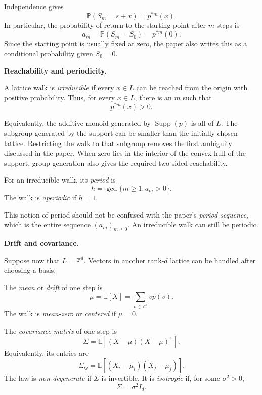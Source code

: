 Independence gives
$$
\mathbb P(S_m=s+x)=p^{*m}(x).
$$
In particular, the probability of return
to the starting point after $m$ steps is
$$
a_m=\mathbb P(S_m=S_0)=p^{*m}(0).
$$
Since the starting point is usually fixed
at zero, the paper also writes this as a
conditional probability given $S_0=0$.

\medskip\noindent
{\bf Reachability and periodicity.}

\begin{definition}
\label{definition-irreducible-lattice-walk}
A lattice walk is \emph{irreducible} if
every $x\in L$ can be reached from the
origin with positive probability. Thus,
for every $x\in L$, there is an $m$ such
that
$$
p^{*m}(x)>0.
$$
\end{definition}

Equivalently, the additive monoid generated
by $\operatorname{Supp}(p)$ is all of $L$.
The subgroup generated by the support can
be smaller than the initially chosen
lattice. Restricting the walk to that
subgroup removes the first ambiguity
discussed in the paper. When zero lies in
the interior of the convex hull of the
support, group generation also gives the
required two-sided reachability.

\begin{definition}
\label{definition-period-lattice-walk}
For an irreducible walk, its \emph{period}
is
$$
h=\gcd\{m\geq 1:a_m>0\}.
$$
The walk is \emph{aperiodic} if $h=1$.
\end{definition}

This notion of period should not be
confused with the paper's \emph{period
sequence}, which is the entire sequence
$(a_m)_{m\geq 0}$. An irreducible walk can
still be periodic.

\medskip\noindent
{\bf Drift and covariance.}

Suppose now that $L=\mathbb Z^d$. Vectors
in another rank-$d$ lattice can be handled
after choosing a basis.

\begin{definition}
\label{definition-drift-lattice-walk}
The \emph{mean} or \emph{drift} of one
step is
$$
\mu=\mathbb E[X]
=\sum_{v\in\mathbb Z^d}v p(v).
$$
The walk is \emph{mean-zero} or
\emph{centered} if $\mu=0$.
\end{definition}

\begin{definition}
\label{definition-covariance-lattice-walk}
The \emph{covariance matrix} of one step
is
$$
\Sigma
=\mathbb E[(X-\mu)(X-\mu)^{\mathsf T}].
$$
Equivalently, its entries are
$$
\Sigma_{ij}
=\mathbb E[(X_i-\mu_i)(X_j-\mu_j)].
$$
The law is \emph{non-degenerate} if
$\Sigma$ is invertible. It is
\emph{isotropic} if, for some
$\sigma^2>0$,
$$
\Sigma=\sigma^2 I_d.
$$
\end{definition}

